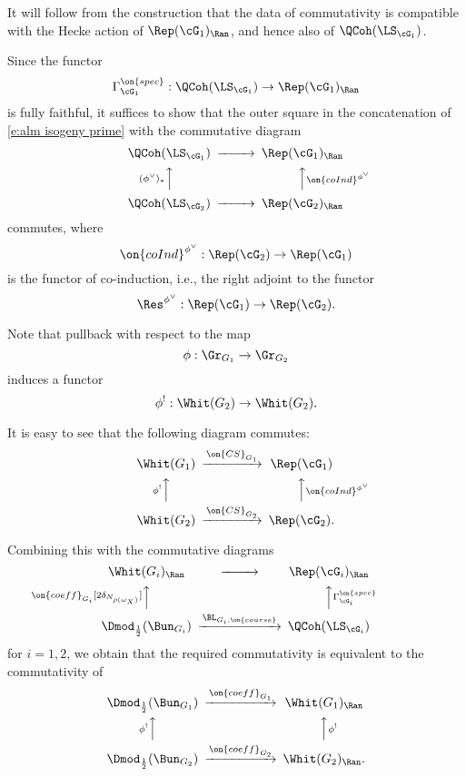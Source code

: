 \documentclass[9pt]{amsart}
\theoremstyle{remark}
\theoremstyle{definition}
\theoremstyle{remark}
\numberwithin{equation}{section}
\begin{document}
It will follow from the construction that the data of commutativity is compatible with the Hecke action of $\Rep(\cG_1)_\Ran$,
and hence also of $\QCoh(\LS_{\cG_1})$. 

\sssec{}

Since the functor
$$\Gamma^{\on{spec}}_{\cG_1}:\QCoh(\LS_{\cG_1}) \to \Rep(\cG_1)_{\Ran}$$
is fully faithful, it suffices to show that the outer square in the concatenation of \eqref{e:alm isogeny prime} with the commutative diagram
\begin{equation} \label{e:alm isogeny''}
\CD
\QCoh(\LS_{\cG_1}) @>>> \Rep(\cG_1)_{\Ran} \\
@A{(\phi^\vee)_*}AA @AA{\on{coInd}^{\phi^\vee}}A \\
\QCoh(\LS_{\cG_2}) @>>> \Rep(\cG_2)_{\Ran}
\endCD
\end{equation} 
commutes, where 
$$\on{coInd}^{\phi^\vee}:\Rep(\cG_2)\to \Rep(\cG_1)$$
is the functor of co-induction, i.e., the right adjoint to the functor
$$\Res^{\phi^\vee}:\Rep(\cG_1)\to \Rep(\cG_2).$$

\sssec{}

Note that pullback with respect to the map 
$$\phi:\Gr_{G_1}\to \Gr_{G_2}$$
induces a functor
$$\phi^!:\Whit(G_2) \to \Whit(G_2).$$

It is easy to see that the following diagram commutes:
$$
\CD
\Whit(G_1) @>{\on{CS}_{G_1}}>>  \Rep(\cG_1) \\
@A{\phi^!}AA  @AA{\on{coInd}^{\phi^\vee}}A  \\
\Whit(G_2) @>{\on{CS}_{G_2}}>>  \Rep(\cG_2).
\endCD
$$

Combining this with the commutative diagrams \cite[Equation (18.4)]{GLC2}
$$
\CD
\Whit(G_i)_\Ran @>>> \Rep(\cG_i)_{\Ran}  \\
@A{\on{coeff}_{G_i}[2\delta_{N_{\rho(\omega_X)}}]}AA @AA{\Gamma^{\on{spec}}_{\cG_i}}A \\
\Dmod_{\frac{1}{2}}(\Bun_{G_i}) @>{\BL_{G_i,\on{course}}}>> \QCoh(\LS_{\cG_i})
\endCD
$$
for $i=1,2$, we obtain that the required commutativity is equivalent to the
commutativity of
\begin{equation} \label{e:alm isogeny'''}
\CD
\Dmod_{\frac{1}{2}}(\Bun_{G_1})  @>{\on{coeff}_{G_1}}>> \Whit(G_1)_\Ran \\
@A{\phi^!}AA @AA{\phi^!}A \\
\Dmod_{\frac{1}{2}}(\Bun_{G_2})  @>{\on{coeff}_{G_2}}>> \Whit(G_2)_\Ran. \\
\endCD
\end{equation} 
\end{document}
